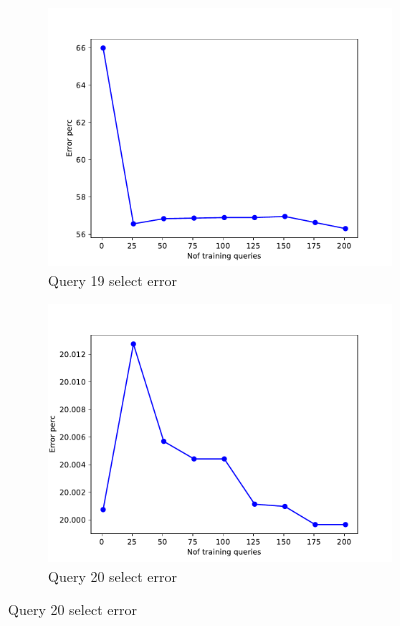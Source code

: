 \begin{figure}[!htb]
    \begin{subfigure}[t]{0.5\textwidth}
      \includegraphics[scale=0.4]{figs/tpch10/tpch10_sel19_error.pdf}
      \caption{Query 19 select error}
      \label{fig:tpch_sel19}
    \end{subfigure}
    \begin{subfigure}[t]{0.5\textwidth}
      \includegraphics[scale=0.4]{figs/tpch10/tpch10_sel20_error.pdf}
      \caption{Query 20 select error}
      \label{fig:tpch_sel20}
     \end{subfigure}


\end{figure}
